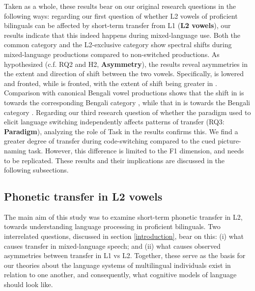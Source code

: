 \documentclass[12 pt]{article}
\newcommand{\nt}[1]{\textipa{[#1]}} %
\begin{document}
Taken as a whole, these results bear on our original research questions in the following ways: regarding our first question of whether L2 vowels of proficient bilinguals can be affected by short-term transfer from L1 (\textbf{L2 vowels}), our results indicate that this indeed happens during mixed-language use. Both the common category \nt{\ae} and the L2-exclusive category \nt{2} show spectral shifts during mixed-language productions compared to non-switched productions. As hypothesized (c.f. RQ2 and H2, \textbf{Asymmetry}), the results reveal asymmetries in the extent and direction of shift between the two vowels. Specifically, \nt{2} is lowered and fronted, while \nt{\ae} is fronted, with the extent of shift being greater in \nt{2}. Comparison with canonical Bengali vowel productions shows that the shift in \nt{\ae} is towards the corresponding Bengali category \nt{\ae}, while that in \nt{2} is towards the Bengali category \nt{a:}. Regarding our third research question of whether the paradigm used to elicit language switching independently affects patterns of transfer (RQ3: \textbf{Paradigm}), analyzing the role of Task in the results confirms this. We find a greater degree of transfer during code-switching compared to the cued picture-naming task. However, this difference is limited to the F1 dimension, and needs to be replicated. These results and their implications are discussed in the following subsections.


\subsection{Phonetic transfer in L2 vowels}

The main aim of this study was to examine short-term phonetic transfer in L2, towards understanding language processing in proficient bilinguals. Two interrelated questions, discussed in section \ref{introduction}, bear on this: (i) what causes transfer in mixed-language speech; and (ii) what causes observed asymmetries between transfer in L1 vs L2. Together, these serve as the basis for our theories about the language systems of multilingual individuals exist in relation to one another, and consequently, what cognitive models of language should look like. 
\end{document}
